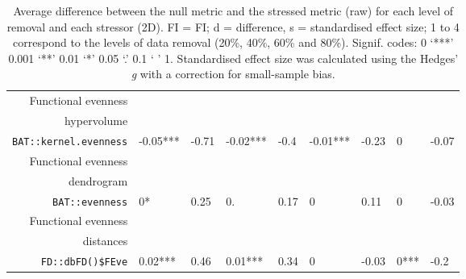 \begin{table}[ht]
\begin{tabular}{rllllllll}
  Functional evenness\\ hypervolume\\ \texttt{BAT::kernel.evenness} & -0.05*** & -0.71 & -0.02*** & -0.4 & -0.01*** & -0.23 & 0 & -0.07 \\ 
  Functional evenness\\ dendrogram\\ \texttt{BAT::evenness} & 0* & 0.25 & 0. & 0.17 & 0 & 0.11 & 0 & -0.03 \\ 
  Functional evenness\\ distances\\ \texttt{FD::dbFD()\$FEve} & 0.02*** & 0.46 & 0.01*** & 0.34 & 0 & -0.03 & 0*** & -0.2 \\ 
   \hline
\end{tabular}
\caption{Average difference between the null metric and the stressed metric (raw) for each level of removal and each stressor (2D). FI = FI; d = difference, s = standardised effect size; 1 to 4 correspond to the levels of data removal (20\%, 40\%, 60\% and 80\%). Signif. codes:  0 ‘***’ 0.001 ‘**’ 0.01 ‘*’ 0.05 ‘.’ 0.1 ‘ ’ 1. Standardised effect size was calculated using the Hedges' \textit{g} with a correction for small-sample bias.} 
\end{table}
